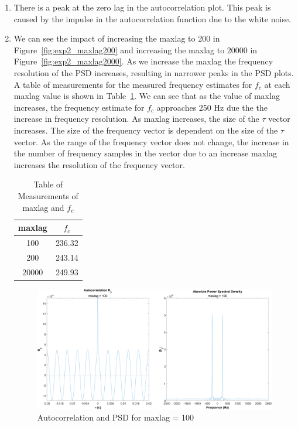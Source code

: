 \documentclass[12pt]{article}
\begin{document}
\begin{enumerate}[label=\roman*)]
	\item %
	There is a peak at the zero lag in the autocorrelation plot. This peak is caused by the impulse in the autocorrelation function due to the white noise.

	\item %

	We can see the impact of increasing the maxlag to 200 in Figure~\ref{fig:exp2_maxlag200} and increasing the maxlag to 20000 in Figure~\ref{fig:exp2_maxlag2000}. As we increase the maxlag the frequency resolution of the PSD increases, resulting in narrower peaks in the PSD plots. A table of measurements for the measured frequency estimates for $f_c$ at each maxlag value is shown in Table~\ref{table:exp2}. We can see that as the value of maxlag increases, the frequency estimate for $f_c$ approaches 250 Hz due the the increase in frequency resolution. As maxlag increases, the size of the $\tau$ vector increases. The size of the frequency vector is dependent on the size of the $\tau$ vector. As the range of the frequency vector does not change, the increase in the number of frequency samples in the vector due to an increase maxlag increases the resolution of the frequency vector.

	\begin{table}[h]
		\centering
		\begin{tabular}{c|c}
			maxlag & $f_c$  \\ \hline
			100    & 236.32 \\
			200    & 243.14 \\
			20000  & 249.93
		\end{tabular}
		\caption{\label{table:exp2}Table of Measurements of maxlag and $f_c$}
	\end{table}

	\begin{figure}[h]
		\centering
		\includegraphics[width=\textwidth]{exp2_maxlag_100}
		\caption{\label{fig:exp2_maxlag100}Autocorrelation and PSD for maxlag = 100}
	\end{figure}


\end{enumerate}
\end{document}
